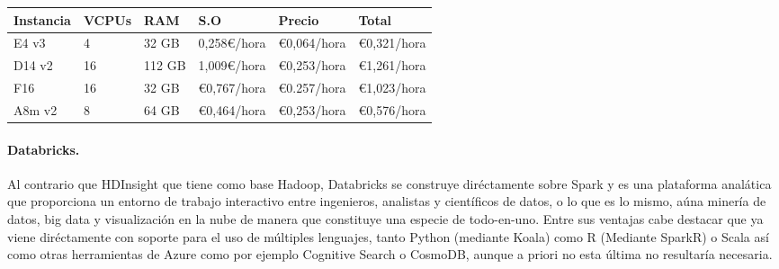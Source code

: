 \documentclass[11pt, a4paper]{article} %
\begin{document}
\begin{table}[htb]
  \centering
  \begin{tabular}{ | P{2cm} | P{2cm} | P{2cm} | P{2cm} | P{2cm} | P{2cm} |}
    \hline
    Instancia & VCPUs & RAM  & S.O & Precio & Total \\ \hline
    E4 v3	& 4 & 32 GB & 0,258€/hora	 & €0,064/hora & €0,321/hora \\ \hline
    D14 v2 & 16 & 112 GB & 1,009€/hora & €0,253/hora & €1,261/hora \\ \hline
    F16 & 16 & 32 GB & €0,767/hora & €0.257/hora & €1,023/hora \\ \hline
    A8m v2 & 8 & 64 GB & €0,464/hora & €0,253/hora & €0,576/hora \\ \hline
  \end{tabular}
\end{table}
\newpage
\paragraph{Databricks.}
Al contrario que HDInsight que tiene como base Hadoop, Databricks se construye diréctamente sobre Spark y es una plataforma analática que proporciona un entorno de trabajo interactivo entre ingenieros, analistas y científicos de datos, o lo que es lo mismo, aúna minería de datos, big data y visualización en la nube de manera que constituye una especie de todo-en-uno. Entre sus ventajas cabe destacar que ya viene diréctamente con soporte para el uso de múltiples lenguajes, tanto Python (mediante Koala) como R (Mediante SparkR) o Scala así como otras herramientas de Azure como por ejemplo Cognitive Search o CosmoDB, aunque a priori no esta última no resultaría necesaria.
\end{document}
